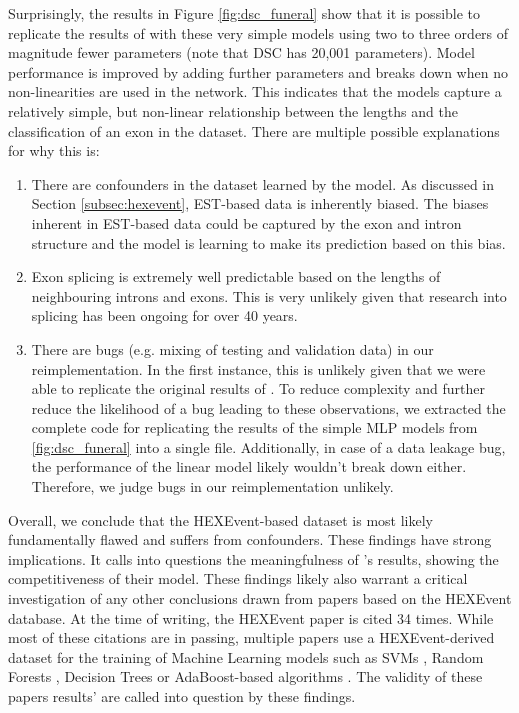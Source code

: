 Surprisingly, the results in Figure \ref{fig:dsc_funeral} show that it is possible to replicate the results of \cite{dsc} with these very simple models using two to three orders of magnitude fewer parameters (note that DSC has 20,001 parameters). Model performance is improved by adding further parameters and breaks down when no non-linearities are used in the network. This indicates that the models capture a relatively simple, but non-linear relationship between the lengths and the classification of an exon in the dataset. 
There are multiple possible explanations for why this is:
\begin{enumerate}
	\item There are confounders in the dataset learned by the model. As discussed in Section \ref{subsec:hexevent}, EST-based data is inherently biased. The biases inherent in EST-based data could be captured by the exon and intron structure and the model is learning to make its prediction based on this bias. 
	\item Exon splicing is extremely well predictable based on the lengths of neighbouring introns and exons. This is very unlikely given that research into splicing has been ongoing for over 40 years. 
	\item There are bugs (e.g. mixing of testing and validation data) in our reimplementation. In the first instance, this is unlikely given that we were able to replicate the original results of \cite{dsc}. To reduce complexity and further reduce the likelihood of a bug leading to these observations, we extracted the complete code for replicating the results of the simple MLP models from \ref{fig:dsc_funeral} into a single file. Additionally, in case of a data leakage bug, the performance of the linear model likely wouldn't break down either. Therefore, we judge bugs in our reimplementation unlikely.
\end{enumerate}

Overall, we conclude that the HEXEvent-based dataset is most likely fundamentally flawed and suffers from confounders.
These findings have strong implications. It calls into questions the meaningfulness of \cite{dsc}'s results, showing the competitiveness of their model. These findings likely also warrant a critical investigation of any other conclusions drawn from papers based on the HEXEvent database. At the time of writing, the HEXEvent paper is cited 34 times. While most of these citations are in passing, multiple papers use a HEXEvent-derived dataset for the training of Machine Learning models such as SVMs \cite{buschhertel}, Random Forests \cite{flawed4} \cite{flawed1}, Decision Trees \cite{flawed2} or AdaBoost-based algorithms \cite{flawed3}. The validity of these papers results' are called into question by these findings.

